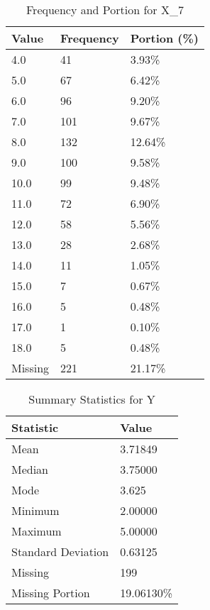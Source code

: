 \begin{table}[H]
\centering
\begin{tabular}{|l|l|l|}
\hline
\textbf{Value} & \textbf{Frequency} & \textbf{Portion (\%)} \\ \hline
4.0 & 41 & 3.93\% \\ \hline
5.0 & 67 & 6.42\% \\ \hline
6.0 & 96 & 9.20\% \\ \hline
7.0 & 101 & 9.67\% \\ \hline
8.0 & 132 & 12.64\% \\ \hline
9.0 & 100 & 9.58\% \\ \hline
10.0 & 99 & 9.48\% \\ \hline
11.0 & 72 & 6.90\% \\ \hline
12.0 & 58 & 5.56\% \\ \hline
13.0 & 28 & 2.68\% \\ \hline
14.0 & 11 & 1.05\% \\ \hline
15.0 & 7 & 0.67\% \\ \hline
16.0 & 5 & 0.48\% \\ \hline
17.0 & 1 & 0.10\% \\ \hline
18.0 & 5 & 0.48\% \\ \hline
Missing & 221 & 21.17\% \\ \hline
\end{tabular}
\caption{Frequency and Portion for X_7}
\end{table}

\begin{table}[H]
\centering
\begin{tabular}{|l|l|}
\hline
\textbf{Statistic} & \textbf{Value} \\ \hline
Mean               & 3.71849 \\ \hline
Median             & 3.75000 \\ \hline
Mode               & 3.625 \\ \hline
Minimum            & 2.00000 \\ \hline
Maximum            & 5.00000 \\ \hline
Standard Deviation & 0.63125 \\ \hline
Missing            & 199 \\ \hline
Missing Portion    & 19.06130\% \\ \hline
\end{tabular}
\caption{Summary Statistics for Y}
\end{table}

